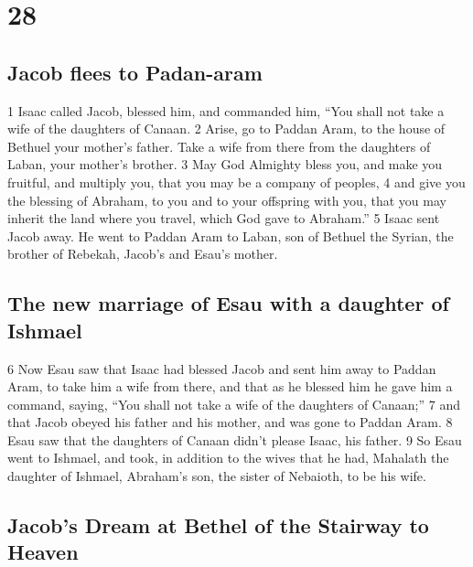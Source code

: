 \hypertarget{section-27}{%
\section{28}\label{section-27}}

\hypertarget{jacob-flees-to-padan-aram}{%
\subsection{Jacob flees to Padan-aram}\label{jacob-flees-to-padan-aram}}

{1} Isaac called Jacob, blessed him, and commanded him, ``You shall not
take a wife of the daughters of Canaan. {2} Arise, go to Paddan Aram, to
the house of Bethuel your mother's father. Take a wife from there from
the daughters of Laban, your mother's brother. {3} May God Almighty
bless you, and make you fruitful, and multiply you, that you may be a
company of peoples, {4} and give you the blessing of Abraham, to you and
to your offspring with you, that you may inherit the land where you
travel, which God gave to Abraham.'' {5} Isaac sent Jacob away. He went
to Paddan Aram to Laban, son of Bethuel the Syrian, the brother of
Rebekah, Jacob's and Esau's mother.

\hypertarget{the-new-marriage-of-esau-with-a-daughter-of-ishmael}{%
\subsection{The new marriage of Esau with a daughter of
Ishmael}\label{the-new-marriage-of-esau-with-a-daughter-of-ishmael}}

{6} Now Esau saw that Isaac had blessed Jacob and sent him away to
Paddan Aram, to take him a wife from there, and that as he blessed him
he gave him a command, saying, ``You shall not take a wife of the
daughters of Canaan;'' {7} and that Jacob obeyed his father and his
mother, and was gone to Paddan Aram. {8} Esau saw that the daughters of
Canaan didn't please Isaac, his father. {9} So Esau went to Ishmael, and
took, in addition to the wives that he had, Mahalath the daughter of
Ishmael, Abraham's son, the sister of Nebaioth, to be his wife.

\hypertarget{jacobs-dream-at-bethel-of-the-stairway-to-heaven}{%
\subsection{Jacob's Dream at Bethel of the Stairway to
Heaven}\label{jacobs-dream-at-bethel-of-the-stairway-to-heaven}}

